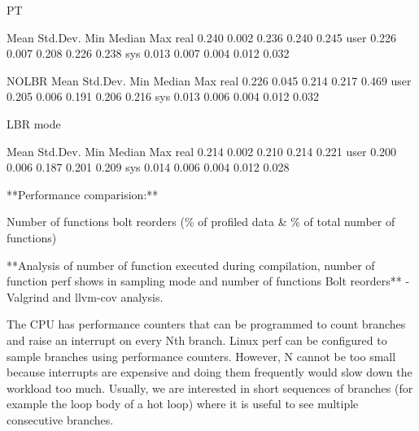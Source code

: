 PT

            Mean        Std.Dev.    Min         Median      Max
real        0.240       0.002       0.236       0.240       0.245       
user        0.226       0.007       0.208       0.226       0.238       
sys         0.013       0.007       0.004       0.012       0.032    


NOLBR
            Mean        Std.Dev.    Min         Median      Max
real        0.226       0.045       0.214       0.217       0.469       
user        0.205       0.006       0.191       0.206       0.216       
sys         0.013       0.006       0.004       0.012       0.032  


LBR mode

            Mean        Std.Dev.    Min         Median      Max
real        0.214       0.002       0.210       0.214       0.221       
user        0.200       0.006       0.187       0.201       0.209       
sys         0.014       0.006       0.004       0.012       0.028    


**Performance comparision:**

Number of functions bolt reorders (\% of profiled data & \% of total number of functions)

**Analysis of number of function executed during compilation, number of function perf shows in sampling mode and number of functions Bolt reorders**
- Valgrind and llvm-cov analysis.

The CPU has performance counters that can be programmed to count branches and raise an interrupt on every Nth branch. Linux perf can be configured to sample branches using performance counters. However, N cannot be too small because interrupts are expensive and doing them frequently would slow down the workload too much. Usually, we are interested in short sequences of branches (for example the loop body of a hot loop) where it is useful to see multiple consecutive branches.





